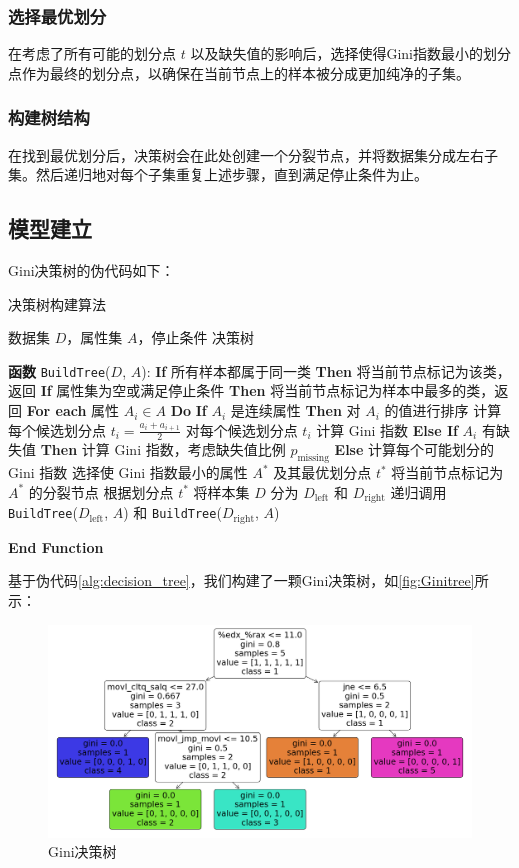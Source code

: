 \subsubsection{选择最优划分}
在考虑了所有可能的划分点 \(t\) 以及缺失值的影响后，选择使得Gini指数最小的划分点作为最终的划分点，以确保在当前节点上的样本被分成更加纯净的子集。

\subsubsection{构建树结构}
在找到最优划分后，决策树会在此处创建一个分裂节点，并将数据集分成左右子集。然后递归地对每个子集重复上述步骤，直到满足停止条件为止。

\subsection{模型建立}
Gini决策树的伪代码如下：
\begin{algorithm}[H]
    \caption{决策树构建算法}
    \label{alg:decision_tree}
    \begin{algorithmic}
        \REQUIRE 数据集 $D$，属性集 $A$，停止条件
        \ENSURE 决策树

        \STATE \textbf{函数} \texttt{BuildTree}($D$, $A$):
        \STATE \quad \textbf{If} 所有样本都属于同一类 \textbf{Then}
        \STATE \quad \quad 将当前节点标记为该类，返回
        \STATE \quad \textbf{If} 属性集为空或满足停止条件 \textbf{Then}
        \STATE \quad \quad 将当前节点标记为样本中最多的类，返回
        \STATE \quad \textbf{For each} 属性 $A_i \in A$ \textbf{Do}
        \STATE \quad \quad \textbf{If} $A_i$ 是连续属性 \textbf{Then}
        \STATE \quad \quad \quad 对 $A_i$ 的值进行排序
        \STATE \quad \quad \quad 计算每个候选划分点 $t_i = \frac{a_i + a_{i+1}}{2}$
        \STATE \quad \quad \quad 对每个候选划分点 $t_i$ 计算 Gini 指数
        \STATE \quad \quad \textbf{Else If} $A_i$ 有缺失值 \textbf{Then}
        \STATE \quad \quad \quad 计算 Gini 指数，考虑缺失值比例 $p_{\text{missing}}$
        \STATE \quad \quad \textbf{Else}
        \STATE \quad \quad \quad 计算每个可能划分的 Gini 指数
        \STATE \quad 选择使 Gini 指数最小的属性 $A^*$ 及其最优划分点 $t^*$
        \STATE \quad 将当前节点标记为 $A^*$ 的分裂节点
        \STATE \quad 根据划分点 $t^*$ 将样本集 $D$ 分为 $D_{\text{left}}$ 和 $D_{\text{right}}$
        \STATE \quad 递归调用 \texttt{BuildTree}($D_{\text{left}}$, $A$) 和 \texttt{BuildTree}($D_{\text{right}}$, $A$)
        
        \STATE \textbf{End Function}
    \end{algorithmic}
\end{algorithm}
基于伪代码\autoref{alg:decision_tree}，我们构建了一颗Gini决策树，如\autoref{fig:Ginitree}所示：
\begin{figure}[H]
    \centering
    \includegraphics[width=1\linewidth]{figures/Ginitree.png}
    \caption{Gini决策树}
    \label{fig:Ginitree}
\end{figure}
